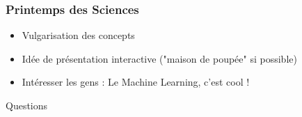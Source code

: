 \documentclass{beamer}
\begin{document}
\begin{frame}
\frametitle{Printemps des Sciences}
\begin{itemize}
  \item Vulgarisation des concepts
  \item Idée de présentation interactive ("maison de poupée" si possible)
  \item Intéresser les gens : Le Machine Learning, c'est cool !
\end{itemize}
\end{frame}

\begin{frame}
\huge Questions
\end{frame}	
 
\end{document}
